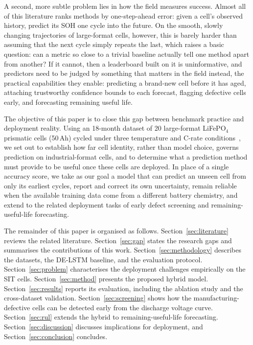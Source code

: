 A second, more subtle problem lies in how the field measures success.
Almost all of this literature ranks methods by one-step-ahead error: given a
cell's observed history, predict its SOH one cycle into the future.
On the smooth, slowly changing trajectories of large-format cells, however, this
is barely harder than assuming that the next cycle simply repeats the last,
which raises a basic question: can a metric so close to a trivial baseline
actually tell one method apart from another?
If it cannot, then a leaderboard built on it is uninformative, and predictors
need to be judged by something that matters in the field instead, the practical
capabilities they enable: predicting a brand-new cell before it has aged,
attaching trustworthy confidence bounds to each forecast, flagging defective
cells early, and forecasting remaining useful life.

The objective of this paper is to close this gap between benchmark practice and
deployment reality.
Using an 18-month dataset of 20 large-format LiFePO$_4$ prismatic cells
(50\,Ah) cycled under three temperature and C-rate
conditions~\cite{ponnambalam2026sitdata}, we set out to establish how far
cell identity, rather than model choice, governs prediction on
industrial-format cells, and to determine what a prediction method must provide
to be useful once these cells are deployed.
In place of a single accuracy score, we take as our goal a model that can
predict an unseen cell from only its earliest cycles, report and correct its own
uncertainty, remain reliable when the available training data come from a
different battery chemistry, and extend to the related deployment tasks of early
defect screening and remaining-useful-life forecasting.

The remainder of this paper is organised as follows.
Section~\ref{sec:literature} reviews the related literature.
Section~\ref{sec:gap} states the research gaps and summarises the contributions
of this work.
Section~\ref{sec:methodology} describes the datasets, the DE-LSTM baseline, and
the evaluation protocol.
Section~\ref{sec:problem} characterises the deployment challenges empirically on
the SIT cells.
Section~\ref{sec:method} presents the proposed hybrid model.
Section~\ref{sec:results} reports its evaluation, including the ablation study and
the cross-dataset validation.
Section~\ref{sec:screening} shows how the manufacturing-defective cells can be
detected early from the discharge voltage curve.
Section~\ref{sec:rul} extends the hybrid to remaining-useful-life forecasting.
Section~\ref{sec:discussion} discusses implications for deployment, and
Section~\ref{sec:conclusion} concludes.
